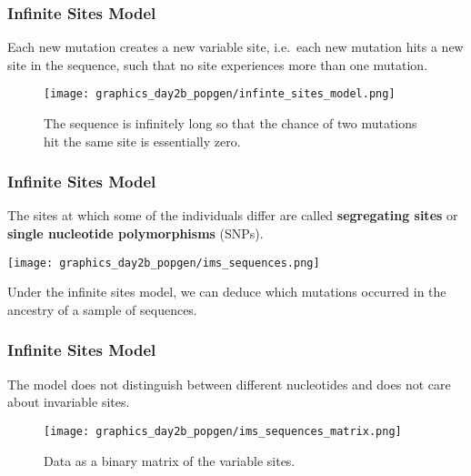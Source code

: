 \documentclass{beamer}
\newcommand{\1}{\ensuremath{\mathbf{1}}}
\begin{document}
%
%
%
\begin{frame}\frametitle{Infinite Sites Model}
	\begin{block}{}
		Each new mutation creates a new variable site, i.e.\ each new mutation hits a new site in the sequence, such that no site experiences more than one mutation.
	\end{block}
	\begin{figure}
	\begin{center}
		\texttt{[image: graphics\_day2b\_popgen/infinte\_sites\_model.png]}
	\end{center}
	\caption{The sequence is infinitely long so that the chance of two mutations hit the same site is essentially zero.}
	\end{figure}
\end{frame}
%
%
%
\begin{frame}\frametitle{Infinite Sites Model}
	The sites at which some of the individuals differ are called \textbf{segregating sites} or \textbf{single nucleotide polymorphisms} (SNPs).
	\begin{center}
		\texttt{[image: graphics\_day2b\_popgen/ims\_sequences.png]}
	\end{center}
	Under the infinite sites model, we can deduce which mutations occurred in the ancestry of a sample of sequences.
\end{frame}
%
%
%
\begin{frame}\frametitle{Infinite Sites Model}
	The model does not distinguish between different nucleotides and does not care about invariable sites.
	\begin{figure}
	\begin{center}
		\texttt{[image: graphics\_day2b\_popgen/ims\_sequences\_matrix.png]}
	\end{center}
	\caption{Data as a binary matrix of the variable sites.}
	\end{figure}
\end{frame}
\end{document}
